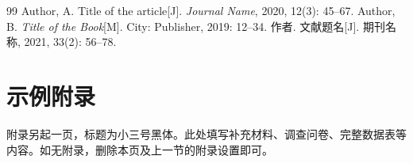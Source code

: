 \documentclass[
  zihao     = -4,          %
  linespread = 1.625,      %
  twoside,                 %
  fontset   = mac          %
]{ctexart}
\begin{document}
\clearpage   %
\thispagestyle{ruleonly}   %
\begingroup
\renewcommand{\refname}{References}
\vspace*{0.86cm}
\begin{thebibliography}{99}
  \fontsize{12}{18}\linespread{1}\selectfont
  \setlength{\itemsep}{0pt}\setlength{\parsep}{0pt}\setlength{\topsep}{0pt}
  \setlength{\parskip}{0pt}
   Author, A. Title of the article[J]. \textit{Journal Name}, 2020, 12(3): 45--67.
   Author, B. \textit{Title of the Book}[M]. City: Publisher, 2019: 12--34.
   作者. 文献题名[J]. 期刊名称, 2021, 33(2): 56--78.
\end{thebibliography}
\endgroup

\clearpage
\appendix
{}
\renewcommand{\thesection}{\Alph{section}}
\section{示例附录}

附录另起一页，标题为小三号黑体。此处填写补充材料、调查问卷、完整数据表等内容。如无附录，删除本页及上一节的附录设置即可。
\end{document}
